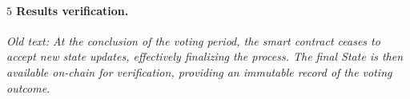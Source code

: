 \paragraph{$\boxed{5}$ Results verification.}
\textit{Old text: At the conclusion of the voting period, the smart contract ceases to accept new state updates, effectively finalizing the process. The final State is then available on-chain for verification, providing an immutable record of the voting outcome.}
